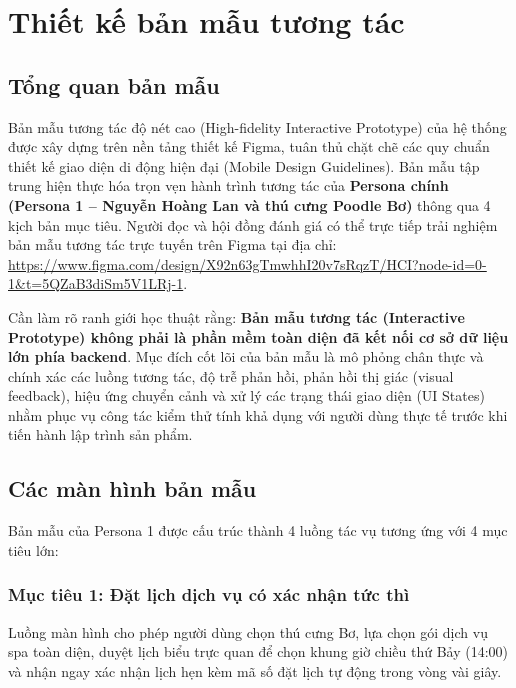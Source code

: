 \section{Thiết kế bản mẫu tương tác}

\subsection{Tổng quan bản mẫu}
Bản mẫu tương tác độ nét cao (High-fidelity Interactive Prototype) của hệ thống được xây dựng trên nền tảng thiết kế Figma, tuân thủ chặt chẽ các quy chuẩn thiết kế giao diện di động hiện đại (Mobile Design Guidelines). Bản mẫu tập trung hiện thực hóa trọn vẹn hành trình tương tác của \textbf{Persona chính (Persona 1 -- Nguyễn Hoàng Lan và thú cưng Poodle Bơ)} thông qua 4 kịch bản mục tiêu. Người đọc và hội đồng đánh giá có thể trực tiếp trải nghiệm bản mẫu tương tác trực tuyến trên Figma tại địa chỉ: \url{https://www.figma.com/design/X92n63gTmwhhI20v7sRqzT/HCI?node-id=0-1&t=5QZaB3diSm5V1LRj-1}.

Cần làm rõ ranh giới học thuật rằng: \textbf{Bản mẫu tương tác (Interactive Prototype) không phải là phần mềm toàn diện đã kết nối cơ sở dữ liệu lớn phía backend}. Mục đích cốt lõi của bản mẫu là mô phỏng chân thực và chính xác các luồng tương tác, độ trễ phản hồi, phản hồi thị giác (visual feedback), hiệu ứng chuyển cảnh và xử lý các trạng thái giao diện (UI States) nhằm phục vụ công tác kiểm thử tính khả dụng với người dùng thực tế trước khi tiến hành lập trình sản phẩm.

\subsection{Các màn hình bản mẫu}
Bản mẫu của Persona 1 được cấu trúc thành 4 luồng tác vụ tương ứng với 4 mục tiêu lớn:

\subsubsection{Mục tiêu 1: Đặt lịch dịch vụ có xác nhận tức thì}
Luồng màn hình cho phép người dùng chọn thú cưng Bơ, lựa chọn gói dịch vụ spa toàn diện, duyệt lịch biểu trực quan để chọn khung giờ chiều thứ Bảy (14:00) và nhận ngay xác nhận lịch hẹn kèm mã số đặt lịch tự động trong vòng vài giây.

